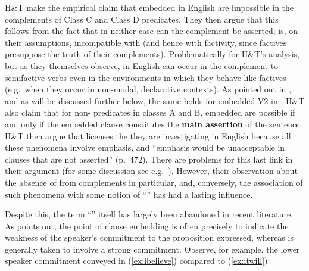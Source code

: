 \documentclass[output=paper]{langsci/langscibook}
\begin{document}
H\&T make the empirical claim that embedded  in English are impossible in the complements of Class C and Class D predicates. They then argue that this follows from the fact that in neither case can the complement be asserted;  is, on their assumptions, incompatible with  (and hence with factivity, since factives presuppose the truth of their complements). Problematically for H\&T's analysis, but as they themselves observe,  in English can occur in the complement to semifactive verbs even in the environments in which they behave like factives (e.g.\ when they occur in non-modal, declarative contexts). As pointed out in \cite{WiklundEtAl2009}, and as will be discussed further below, the same holds for embedded V2 in .  H\&T also claim that for non- predicates in classes A and B, embedded  are possible if and only if the embedded clause constitutes the \textbf{main assertion} of the sentence. H\&T then argue that  licenses the  they are investigating in English because all these phenomena involve emphasis, and ``emphasis would be unacceptable in clauses that are not asserted'' (p.\ 472). There are problems for this last link in their argument (for some discussion see e.g.\ \citealt{Heycock2006}).  However, their observation about the absence of  from  complements in particular, and, conversely, the association of such phenomena with some notion of ``'' has had a lasting influence.

Despite this, the term ``'' itself has largely been abandoned in recent literature. As \citet[1041]{SimonsEtAl2010} points out, the point of clause embedding is often precisely to indicate the weakness of the speaker's commitment to the proposition expressed, whereas  is generally taken to involve a strong commitment. Observe, for example,  the lower speaker commitment conveyed in (\ref{ex:ibelieve}) compared to (\ref{ex:itwill}):  

\end{document}
